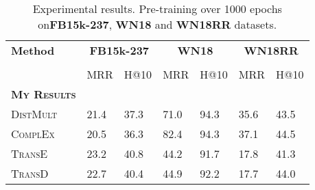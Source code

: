 \begin{table}[h]
    \centering
    \begin{tabular}{lllllll}
        \toprule
        \textbf{Method} &
        \multicolumn{2}{c}{\textbf{FB15k-237}} & 
        \multicolumn{2}{c}{\textbf{WN18}} & 
        \multicolumn{2}{c}{\textbf{WN18RR}}\\
        
        \cmidrule{2-6} \cmidrule{7-7} \\
        {} & MRR & H@10 & MRR & H@10 & MRR & H@10 \\
        
        \midrule
         
        \textbf{\textsc{My Results}} 
        &  &  &  &  &  & \\
        
       \textsc{DistMult}  
        & 21.4 & 37.3 & 71.0 & 94.3 & 35.6 & 43.5 \\
        
        \textsc{ComplEx}   
        & 20.5 & 36.3 & 82.4 & 94.3 & 37.1 & 44.5 \\
         
        \textsc{TransE}    
        & 23.2 & 40.8 & 44.2 & 91.7 & 17.8 & 41.3 \\
        
        \textsc{TransD}    
        & 22.7 & 40.4 & 44.9 & 92.2 & 17.7 & 44.0 \\ 
        \bottomrule
    \end{tabular}
    \caption{Experimental results.
    Pre-training over 1000 epochs on\textbf{FB15k-237},
  \textbf{WN18} and \textbf{WN18RR} datasets.}
\label{tab:result_table2_pretraining}
\end{table}